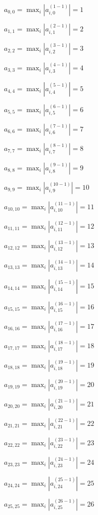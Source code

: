 \documentclass[a4paper,12pt]{article}
\begin{document}
$a _{ 0, 0 } =  \max _i |a _{ i, 0 } ^{ (1 - 1) } | = 1$

$a _{ 1, 1 } =  \max _i |a _{ i, 1 } ^{ (2 - 1) } | = 2$

$a _{ 2, 2 } =  \max _i |a _{ i, 2 } ^{ (3 - 1) } | = 3$

$a _{ 3, 3 } =  \max _i |a _{ i, 3 } ^{ (4 - 1) } | = 4$

$a _{ 4, 4 } =  \max _i |a _{ i, 4 } ^{ (5 - 1) } | = 5$

$a _{ 5, 5 } =  \max _i |a _{ i, 5 } ^{ (6 - 1) } | = 6$

$a _{ 6, 6 } =  \max _i |a _{ i, 6 } ^{ (7 - 1) } | = 7$

$a _{ 7, 7 } =  \max _i |a _{ i, 7 } ^{ (8 - 1) } | = 8$

$a _{ 8, 8 } =  \max _i |a _{ i, 8 } ^{ (9 - 1) } | = 9$

$a _{ 9, 9 } =  \max _i |a _{ i, 9 } ^{ (10 - 1) } | = 10$

$a _{ 10, 10 } =  \max _i |a _{ i, 10 } ^{ (11 - 1) } | = 11$

$a _{ 11, 11 } =  \max _i |a _{ i, 11 } ^{ (12 - 1) } | = 12$

$a _{ 12, 12 } =  \max _i |a _{ i, 12 } ^{ (13 - 1) } | = 13$

$a _{ 13, 13 } =  \max _i |a _{ i, 13 } ^{ (14 - 1) } | = 14$

$a _{ 14, 14 } =  \max _i |a _{ i, 14 } ^{ (15 - 1) } | = 15$

$a _{ 15, 15 } =  \max _i |a _{ i, 15 } ^{ (16 - 1) } | = 16$

$a _{ 16, 16 } =  \max _i |a _{ i, 16 } ^{ (17 - 1) } | = 17$

$a _{ 17, 17 } =  \max _i |a _{ i, 17 } ^{ (18 - 1) } | = 18$

$a _{ 18, 18 } =  \max _i |a _{ i, 18 } ^{ (19 - 1) } | = 19$

$a _{ 19, 19 } =  \max _i |a _{ i, 19 } ^{ (20 - 1) } | = 20$

$a _{ 20, 20 } =  \max _i |a _{ i, 20 } ^{ (21 - 1) } | = 21$

$a _{ 21, 21 } =  \max _i |a _{ i, 21 } ^{ (22 - 1) } | = 22$

$a _{ 22, 22 } =  \max _i |a _{ i, 22 } ^{ (23 - 1) } | = 23$

$a _{ 23, 23 } =  \max _i |a _{ i, 23 } ^{ (24 - 1) } | = 24$

$a _{ 24, 24 } =  \max _i |a _{ i, 24 } ^{ (25 - 1) } | = 25$

$a _{ 25, 25 } =  \max _i |a _{ i, 25 } ^{ (26 - 1) } | = 26$
\end{document}
